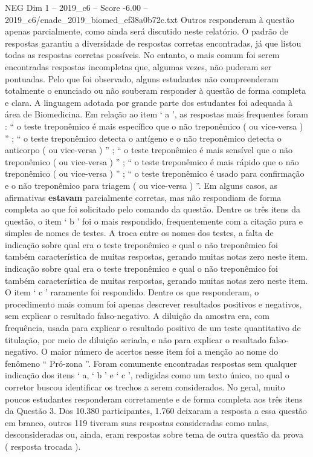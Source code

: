 \begin{textsample}{NEG Dim 1 – 2019\_c6 – Score -6.00 – 2019\_c6/enade\_2019\_biomed\_ef38a0b72c.txt}
Outros responderam à questão apenas parcialmente, como ainda será discutido neste relatório.
O padrão de respostas garantiu a diversidade de respostas corretas encontradas, já que listou todas as respostas corretas possíveis.
No entanto, o mais comum foi serem encontradas respostas incompletas que, algumas vezes, não puderam ser pontuadas.
Pelo que foi observado, alguns estudantes não compreenderam totalmente o enunciado ou não souberam responder à questão de forma completa e clara.
A linguagem adotada por grande parte dos estudantes foi adequada à área de Biomedicina.
Em relação ao item ‘ a ’, as respostas mais frequentes foram : “ o teste treponêmico é mais específico que o não treponêmico ( ou vice-versa ) ” ; “ o teste treponêmico detecta o antígeno e o não treponêmico detecta o anticorpo ( ou vice-versa ) ” ; “ o teste treponêmico é mais sensível que o não treponêmico ( ou vice-versa ) ” ; “ o teste treponêmico é mais rápido que o não treponêmico ( ou vice-versa ) ” ; “ o teste treponêmico é usado para confirmação e o não treponêmico para triagem ( ou vice-versa ) ”.
Em alguns casos, as afirmativas \textbf{estavam} parcialmente corretas, mas não respondiam de forma completa ao que foi solicitado pelo comando da questão.
Dentre os três itens da questão, o item ‘ b ’ foi o mais respondido, frequentemente com a citação pura e simples de nomes de testes.
A troca entre os nomes dos testes, a falta de indicação sobre qual era o teste treponêmico e qual o não treponêmico foi também característica de muitas respostas, gerando muitas notas zero neste item. indicação sobre qual era o teste treponêmico e qual o não treponêmico foi também característica de muitas respostas, gerando muitas notas zero neste item.
O item ‘ c ’ raramente foi respondido.
Dentre os que responderam, o procedimento mais comum foi apenas descrever resultados positivos e negativos, sem explicar o resultado falso-negativo.
A diluição da amostra era, com frequência, usada para explicar o resultado positivo de um teste quantitativo de titulação, por meio de diluição seriada, e não para explicar o resultado falso-negativo.
O maior número de acertos nesse item foi a menção ao nome do fenômeno “ Pró-zona ”.
Foram comumente encontradas respostas sem qualquer indicação dos itens ‘ a, ‘ b ’ e ‘ c ’, redigidas como um texto único, no qual o corretor buscou identificar os trechos a serem considerados.
No geral, muito poucos estudantes responderam corretamente e de forma completa aos três itens da Questão 3.
Dos 10.380 participantes, 1.760 deixaram a resposta a essa questão em branco, outros 119 tiveram suas respostas consideradas como nulas, desconsideradas ou, ainda, eram respostas sobre tema de outra questão da prova ( resposta trocada ).

\end{textsample}
